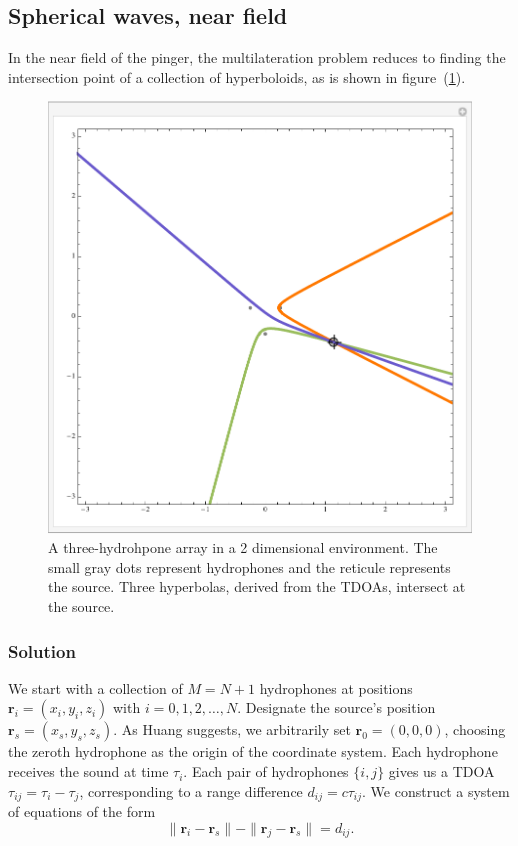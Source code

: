 \documentclass[10pt]{article}
\begin{document}
\subsection{Spherical waves, near field}
\label{sec:near-field}

In the near field of the pinger, the multilateration problem reduces to finding the intersection point of a collection of hyperboloids, as is shown in figure~(\ref{fig:hyperbola-good}).

\begin{figure}[htbp]
\begin{center}
\includegraphics[scale=0.5]{hyperbola-good.pdf}
\caption{A three-hydrohpone array in a 2 dimensional environment.  The small gray dots represent hydrophones and the reticule represents the source.  Three hyperbolas, derived from the TDOAs, intersect at the source.}
\label{fig:hyperbola-good}
\end{center}
\end{figure}

\subsubsection{Solution}

We start with a collection of \(M=N+1\) hydrophones at positions \(\mathbf{r}_i=(x_i,y_i,z_i)\) with \(i=0,1,2,\dots,N\).  Designate the source's position \(\mathbf{r}_s=(x_s,y_s,z_s)\).  As Huang \cite{Huang} suggests, we arbitrarily set \(\mathbf{r}_0=(0,0,0)\), choosing the zeroth hydrophone as the origin of the coordinate system.  Each hydrophone receives the sound at time \(\tau_i\).  Each pair of hydrophones \(\{i,j\}\) gives us a TDOA \(\tau_{ij}=\tau_i-\tau_j\), corresponding to a range difference \(d_{ij}=c \tau_{ij}\).  We construct a system of equations of the form
\begin{equation}\label{eq:hyperboloid-ij}
\|\mathbf{r}_i-\mathbf{r}_s\|-\|\mathbf{r}_j-\mathbf{r}_s\|=d_{ij}.
\end{equation}
\end{document}
